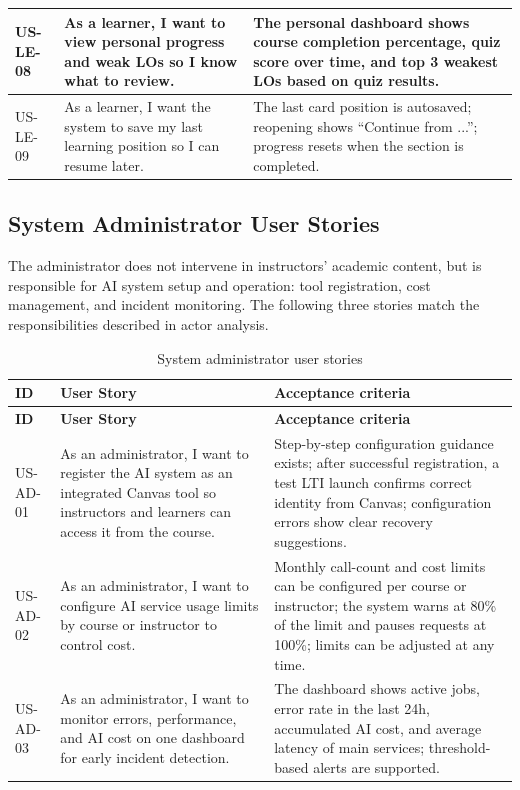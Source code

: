 \begin{longtable}{|p{1.6cm}|p{5.6cm}|p{7cm}|}
\hline
US-LE-08 & As a learner, I want to view personal progress and weak LOs so I know what to review. & The personal dashboard shows course completion percentage, quiz score over time, and top 3 weakest LOs based on quiz results. \\
\hline
US-LE-09 & As a learner, I want the system to save my last learning position so I can resume later. & The last card position is autosaved; reopening shows ``Continue from ...''; progress resets when the section is completed. \\
\hline
\end{longtable}
\endgroup

\subsection{System Administrator User Stories}

The administrator does not intervene in instructors' academic content, but is
responsible for AI system setup and operation: tool registration, cost
management, and incident monitoring. The following three stories match the
responsibilities described in actor analysis.

\begingroup
\scriptsize
\setlength{\tabcolsep}{3pt}
\begin{longtable}{|p{1.6cm}|p{5.6cm}|p{7cm}|}
\caption{System administrator user stories}
\label{tab:user-stories-admin}\\
\hline
\textbf{ID} & \textbf{User Story} & \textbf{Acceptance criteria} \\
\hline
\endfirsthead
\hline
\textbf{ID} & \textbf{User Story} & \textbf{Acceptance criteria} \\
\hline
\endhead
US-AD-01 & As an administrator, I want to register the AI system as an integrated Canvas tool so instructors and learners can access it from the course. & Step-by-step configuration guidance exists; after successful registration, a test LTI launch confirms correct identity from Canvas; configuration errors show clear recovery suggestions. \\
\hline
US-AD-02 & As an administrator, I want to configure AI service usage limits by course or instructor to control cost. & Monthly call-count and cost limits can be configured per course or instructor; the system warns at 80\% of the limit and pauses requests at 100\%; limits can be adjusted at any time. \\
\hline
US-AD-03 & As an administrator, I want to monitor errors, performance, and AI cost on one dashboard for early incident detection. & The dashboard shows active jobs, error rate in the last 24h, accumulated AI cost, and average latency of main services; threshold-based alerts are supported. \\
\hline
\end{longtable}
\endgroup

